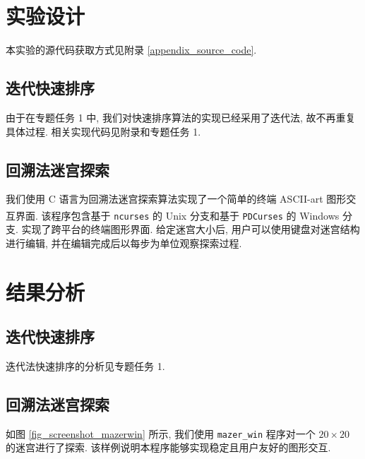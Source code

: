\documentclass[12pt]{article}
\begin{document}
\section{实验设计}

本实验的源代码获取方式见附录 \ref{appendix_source_code}.

\subsection{迭代快速排序}

由于在专题任务 1 中, 我们对快速排序算法的实现已经采用了迭代法, 故不再重复具体过程. 相关实现代码见附录和专题任务 1.

\subsection{回溯法迷宫探索}

我们使用 C 语言为回溯法迷宫探索算法实现了一个简单的终端 ASCII-art 图形交互界面. 该程序包含基于 \texttt{ncurses} \cite{bib_ncurses} 的 Unix\textsuperscript{\textregistered} 分支和基于 \texttt{PDCurses} \cite{bib_pdcurses} 的 Windows\textsuperscript{\textregistered} 分支. 实现了跨平台的终端图形界面. 给定迷宫大小后, 用户可以使用键盘对迷宫结构进行编辑, 并在编辑完成后以每步为单位观察探索过程.

\section{结果分析}

\subsection{迭代快速排序}

迭代法快速排序的分析见专题任务 1.

\subsection{回溯法迷宫探索}

如图 \ref{fig_screenshot_mazerwin} 所示, 我们使用 \texttt{mazer\_win} 程序对一个 $20 \times 20$ 的迷宫进行了探索. 该样例说明本程序能够实现稳定且用户友好的图形交互.
\end{document}
